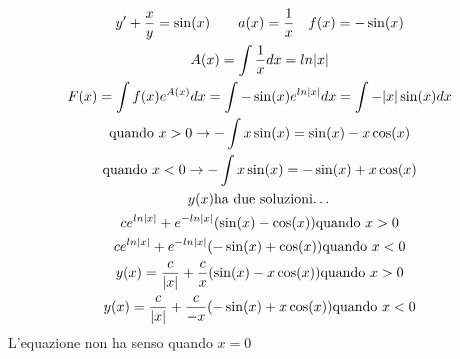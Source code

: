 \documentclass[a4paper, oneside]{article}
\begin{document}
\begin{proposition}
    \begin{gather*}
        y' + \frac{x}{y} = \sin(x) \qquad a(x) = \frac{1}{x} \quad f(x) = -\sin(x)\\
        A(x) = \int \frac{1}{x} dx = ln |x|\\
        F(x) = \int f(x) e^{A(x)} dx = \int -\sin(x)e^{ln|x|} dx = \int -|x| \sin(x) dx\\
        \text{quando } x>0 \to -\int x \sin(x) = \sin(x) - x \cos(x) \\
        \text{quando } x<0 \to -\int x \sin(x) = -\sin(x) + x \cos(x) \\
        y(x) \text{ha due soluzioni\dots}\\
        c e^{ln|x|}+e^{-ln|x|} (\sin(x)-\cos(x)) \text{quando } x>0\\
        c e^{ln|x|}+e^{-ln|x|} (-\sin(x)+\cos(x)) \text{quando } x<0\\
        y(x) = \frac{c}{|x|} + \frac{c}{x}(\sin(x)-x\cos(x)) \text{quando } x>0\\
        y(x) = \frac{c}{|x|} + \frac{c}{-x}(-\sin(x)+x\cos(x)) \text{quando } x<0\\
    \end{gather*}
L'equazione non ha senso quando $x=0$\\
\end{proposition}
\end{document}

